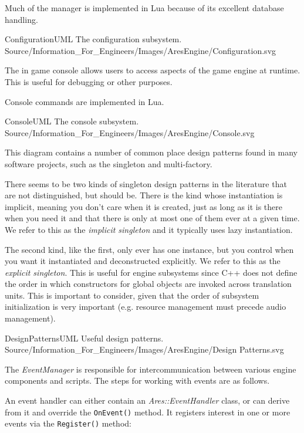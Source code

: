 Much of the manager is implemented in Lua because of its excellent database handling.

\FullPageLandscapeDiagram
    {ConfigurationUML}
    {The configuration subsystem.}
    {Source/Information_For_Engineers/Images/AresEngine/Configuration.svg}

\page
{}
The in game console allows users to access aspects of the game engine at runtime. This is useful for debugging or other purposes.

Console commands are implemented in Lua.

\FullPageLandscapeDiagram
    {ConsoleUML}
    {The console subsystem.}
    {Source/Information_For_Engineers/Images/AresEngine/Console.svg}

\page
{}
This diagram contains a number of common place design patterns found in many software projects, such as the singleton and multi-factory. 

There seems to be two kinds of singleton design patterns in the literature that are not distinguished, but should be. There is the kind whose instantiation is implicit, meaning you don't care when it is created, just as long as it is there when you need it and that there is only at most one of them ever at a given time. We refer to this as the {\it implicit singleton} and it typically uses lazy instantiation.

The second kind, like the first, only ever has one instance, but you control when you want it instantiated and deconstructed explicitly. We refer to this as the {\it explicit singleton}. This is useful for engine subsystems since C++ does not define the order in which constructors for global objects are invoked across translation units. This is important to consider, given that the order of subsystem initialization is very important (e.g. resource management must precede audio management).

\FullPageLandscapeDiagram
    {DesignPatternsUML}
    {Useful design patterns.}
    {Source/Information_For_Engineers/Images/AresEngine/Design Patterns.svg}

\page 
{}
The {\it EventManager} is responsible for intercommunication between various engine components and scripts. The steps for working with events are as follows.

An event handler can either contain an {\it Ares::EventHandler} class, or can derive from it and override the {\tt OnEvent()} method. It registers interest in one or more events via the {\tt Register()} method:

